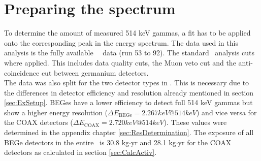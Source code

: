 \documentclass[encoding=utf8,british]{tumphthesis}
\begin{document}

\section{Preparing the spectrum}

To determine the amount of measured 514 keV gammas, a fit has to be applied onto the corresponding peak in the energy spectrum.
The data used in this analysis is the fully available \gerda\ \PII\ data (run 53 to 92).
The standard \gerda\ analysis cuts where applied.
This includes data quality cuts, the Muon veto cut and the anti-coincidence cut between germanium detectors.
\\

The data was also split for the two detector types in \gerda.
This is necessary due to the differences in detector efficiency and resolution already mentioned in section \ref{sec:ExSetup}.
BEGes have a lower efficiency to detect full 514 keV gammas but show a higher energy resolution ($\Delta E_{\mathrm{BEGe}} = 2.267\unit{keV}  @ 514 \unit{keV}$) and vice versa for the COAX detectors ($\Delta E_{\mathrm{COAX}} = 2.720\unit{keV} @ 514 \unit{keV}$).
These values were determined in the appendix chapter \ref{sec:ResDetermination}.
The exposure of all BEGe detectors in the entire \PII\ is 30.8 kg$\cdot$yr and 28.1 kg$\cdot$yr for the COAX detectors as calculated in section \ref{sec:CalcActiv}.
\\
\end{document}
